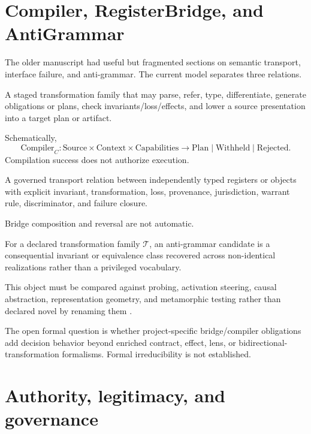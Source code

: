 \section{Compiler, RegisterBridge, and AntiGrammar}

The older manuscript had useful but fragmented sections on semantic transport, interface failure, and anti-grammar. The current model separates three relations.

\begin{definition}[Compiler]
A staged transformation family that may parse, refer, type, differentiate, generate obligations or plans, check invariants/loss/effects, and lower a source presentation into a target plan or artifact.
\end{definition}
Schematically,
\begin{equation}
\mathrm{Compiler}_C:
\mathrm{Source}\times\mathrm{Context}\times\mathrm{Capabilities}
\rightarrow \mathrm{Plan}\;|\;\mathrm{Withheld}\;|\;\mathrm{Rejected}.
\end{equation}
Compilation success does not authorize execution.

\begin{definition}[RegisterBridge]
A governed transport relation between independently typed registers or objects with explicit invariant, transformation, loss, provenance, jurisdiction, warrant rule, discriminator, and failure closure.
\end{definition}
Bridge composition and reversal are not automatic.

\begin{definition}[AntiGrammar]
For a declared transformation family $\mathcal{T}$, an anti-grammar candidate is a consequential invariant or equivalence class recovered across non-identical realizations rather than a privileged vocabulary.
\end{definition}
This object must be compared against probing, activation steering, causal abstraction, representation geometry, and metamorphic testing rather than declared novel by renaming them \cite{ElazarEtAl2021,ZhangEtAl2022SemanticGeometry,RibeiroEtAl2020CheckList,GardnerEtAl2020Contrast,ChoEtAl2025Metamorphic,MassiddaEtAl2023,YeEtAl2026SteeringSignals}.

The open formal question is whether project-specific bridge/compiler obligations add decision behavior beyond enriched contract, effect, lens, or bidirectional-transformation formalisms. Formal irreducibility is not established.

\section{Authority, legitimacy, and governance}


